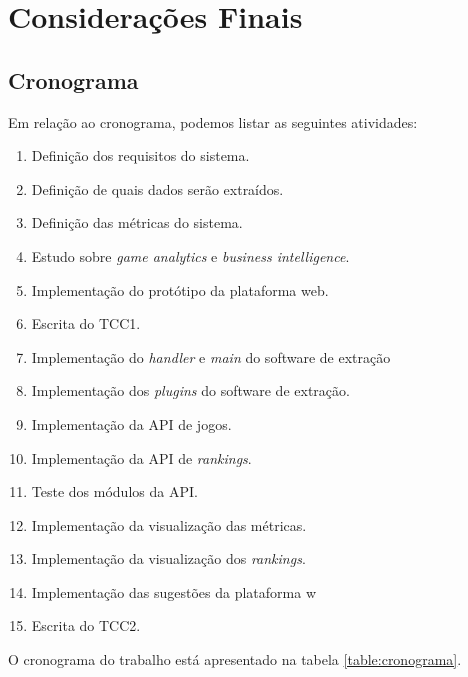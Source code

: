 \chapter[Considerações Finais]{Considerações Finais}
\section{Cronograma}
Em relação ao cronograma, podemos listar as seguintes atividades:
\begin{enumerate}
	\item \label{t1} Definição dos requisitos do sistema.
	\item \label{t2} Definição de quais dados serão extraídos.
	\item \label{t3} Definição das métricas do sistema.
	\item \label{t4} Estudo sobre \textit{game analytics} e \textit{business intelligence}.
	\item \label{t5} Implementação do protótipo da plataforma web.
	\item \label{t6} Escrita do TCC1.
	\item \label{t7} Implementação do \textit{handler} e \textit{main} do software de extração
	\item \label{t8} Implementação dos \textit{plugins} do software de extração.
	\item \label{t9} Implementação da API de jogos.
	\item \label{t10} Implementação da API de \textit{rankings}.
	\item \label{t11} Teste dos módulos da API.
	\item \label{t12} Implementação da  visualização das métricas.
	\item \label{t13} Implementação da visualização dos \textit{rankings}.
	\item \label{t14} Implementação das sugestões da plataforma w
	\item \label{t15} Escrita do TCC2.
\end{enumerate}
O cronograma do trabalho está apresentado na tabela \ref{table:cronograma}.
